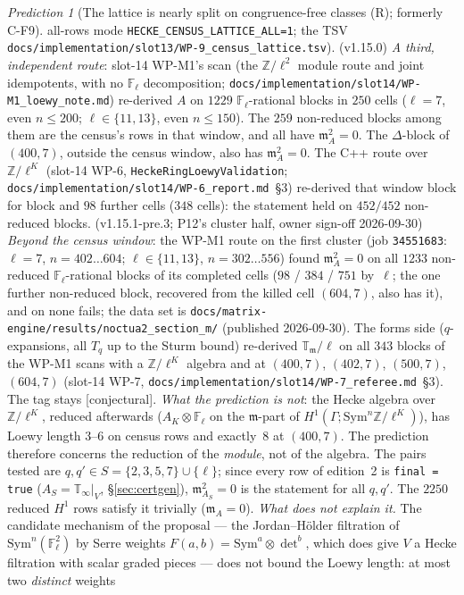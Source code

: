 \documentclass[11pt]{article}
\theoremstyle{remark}
\newtheorem{prediction}[theorem]{Prediction}
\newcommand{\F}{\mathbb{F}}
\newcommand{\Z}{\mathbb{Z}}
\newcommand{\Sym}{\mathrm{Sym}}
\newcommand{\Ga}{\Gamma}
\newcommand{\Fl}{\F_\ell}
\newcommand{\T}{\mathbb{T}}
\newcommand{\m}{\mathfrak{m}}
\newcommand{\CONJ}{\textsf{[conjectural]}}
\begin{document}
\begin{prediction}[The lattice is nearly split on congruence-free classes (R); formerly C-F9]
all-rows mode \texttt{HECKE\_CENSUS\_LATTICE\_ALL=1}; the TSV \texttt{docs/implementation/slot13/WP-9\_census\_lattice.tsv}).
(v1.15.0) \emph{A third, independent route}: slot-14 WP-M1's scan (the $\Z/\ell^2$ module route and joint idempotents, with no
$\Fl$ decomposition; \texttt{docs/implementation/slot14/WP-M1\_loewy\_note.md}) re-derived $A$ on $1229$ $\Fl$-rational blocks in $250$
cells ($\ell=7$, even $n\le200$; $\ell\in\{11,13\}$, even $n\le150$). The $259$ non-reduced blocks among them are the census's rows in
that window, and all have $\m_A^2=0$. The $\Delta$-block of $(400,7)$, outside the census window, also has $\m_A^2=0$. The C++
route over $\Z/\ell^{K}$ (slot-14 WP-6, \texttt{HeckeRingLoewyValidation}; \texttt{docs/implementation/slot14/WP-6\_report.md}~\S3)
re-derived that window block for block and $98$ further cells ($348$ cells): the statement held on $452/452$ non-reduced blocks.
(v1.15.1-pre.3; P12's cluster half, owner sign-off 2026-09-30) \emph{Beyond the census window}: the WP-M1 route on the first cluster (job
\texttt{34551683}: $\ell=7$, $n=402\ldots604$; $\ell\in\{11,13\}$, $n=302\ldots556$) found $\m_A^2=0$ on all $1233$ non-reduced
$\Fl$-rational blocks of its completed cells ($98$ / $384$ / $751$ by~$\ell$; the one further non-reduced block, recovered from the
killed cell $(604,7)$, also has it), and on none fails; the data set is \texttt{docs/matrix-engine/results/noctua2\_section\_m/}
(published 2026-09-30). The forms side ($q$-expansions, all $T_q$ up to the Sturm bound) re-derived $\T_\m/\ell$ on all $343$ blocks of
the WP-M1 scans with a $\Z/\ell^{K}$ algebra and at $(400,7)$, $(402,7)$, $(500,7)$, $(604,7)$ (slot-14 WP-7,
\texttt{docs/implementation/slot14/WP-7\_referee.md}~\S3). The tag stays \CONJ.
\emph{What the prediction is not}: the Hecke algebra over $\Z/\ell^{K}$, reduced afterwards ($A_K\otimes\Fl$ on the $\m$-part of $H^1(\Ga;\Sym^n\Z/\ell^{K})$), has Loewy
length $3$--$6$ on census rows and exactly~$8$ at $(400,7)$. The prediction therefore concerns the reduction of the \emph{module}, not
of the algebra.
The pairs tested are $q,q'\in S=\{2,3,5,7\}\cup\{\ell\}$; since every row of edition~2 is \texttt{final = true}
($A_S=\T_\infty|_V$, \S\ref{sec:certgen}), $\m_{A_S}^2=0$ is the statement for all $q,q'$. The $2250$ reduced $H^1$
rows satisfy it trivially ($\m_A=0$). \emph{What does not explain it.} The candidate mechanism of the proposal ---
the Jordan--H\"older filtration of $\Sym^n(\Fl^2)$ by Serre weights $F(a,b)=\Sym^a\otimes\det^b$, which does give $V$ a
Hecke filtration with scalar graded pieces --- does not bound the Loewy length: at most two \emph{distinct} weights

\end{prediction}
\end{document}
